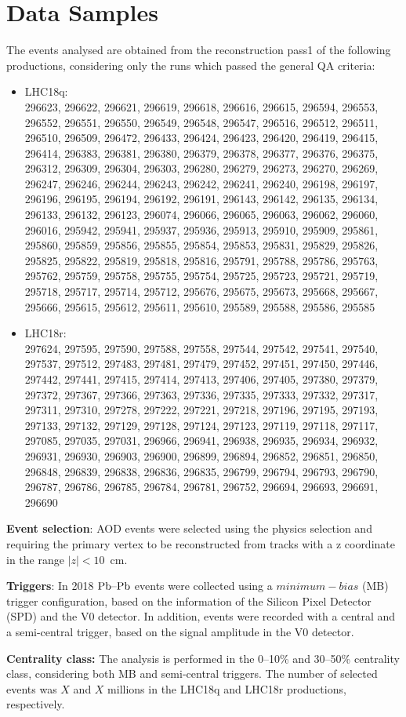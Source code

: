 \section{Data Samples}
The events analysed are obtained from the reconstruction pass1 of the following productions, considering only the runs which passed the general QA criteria:\\

\begin{itemize}
\item LHC18q:\\
 296623, 296622, 296621, 296619, 296618, 296616, 296615, 296594, 296553, 296552, 296551, 296550, 296549, 296548, 296547, 296516, 296512, 296511, 296510, 296509, 296472, 296433, 296424, 296423, 296420, 296419, 296415, 296414, 296383, 296381, 296380, 296379, 296378, 296377, 296376, 296375, 296312, 296309, 296304, 296303, 296280, 296279, 296273, 296270, 296269, 296247, 296246, 296244, 296243, 296242, 296241, 296240, 296198, 296197, 296196, 296195, 296194, 296192, 296191, 296143, 296142, 296135, 296134, 296133, 296132, 296123, 296074, 296066, 296065, 296063, 296062, 296060, 296016, 295942, 295941, 295937, 295936, 295913, 295910, 295909, 295861, 295860, 295859, 295856, 295855, 295854, 295853, 295831, 295829, 295826, 295825, 295822, 295819, 295818, 295816, 295791, 295788, 295786, 295763, 295762, 295759, 295758, 295755, 295754, 295725, 295723, 295721, 295719, 295718, 295717, 295714, 295712, 295676, 295675, 295673, 295668, 295667, 295666, 295615, 295612, 295611, 295610, 295589, 295588, 295586, 295585 
\item LHC18r:\\
 297624, 297595, 297590, 297588, 297558, 297544, 297542, 297541, 297540, 297537, 297512, 297483, 297481, 297479, 297452, 297451, 297450, 297446, 297442, 297441, 297415, 297414, 297413, 297406, 297405, 297380, 297379, 297372, 297367, 297366, 297363, 297336, 297335, 297333, 297332, 297317, 297311, 297310, 297278, 297222, 297221, 297218, 297196, 297195, 297193, 297133, 297132, 297129, 297128, 297124, 297123, 297119, 297118, 297117, 297085, 297035, 297031, 296966, 296941, 296938, 296935, 296934, 296932, 296931, 296930, 296903, 296900, 296899, 296894, 296852, 296851, 296850, 296848, 296839, 296838, 296836, 296835, 296799, 296794, 296793, 296790, 296787, 296786, 296785, 296784, 296781, 296752, 296694, 296693, 296691, 296690 
\end{itemize}

{\bf Event selection}: AOD events were selected using the physics selection and requiring the primary vertex to be reconstructed from tracks with a z coordinate in the range $|z|<10$~cm.

{\bf Triggers}: In 2018 $\mbox{Pb--Pb}$ events were collected using a $minimum-bias$ (MB) trigger configuration, based on the information of the Silicon Pixel Detector (SPD) and the V0 detector. In addition, events were recorded with a central and a semi-central trigger, based on the signal amplitude in the V0 detector.

{\bf Centrality class:} The analysis is performed in the 0--10\% and 30--50\% centrality class, considering both MB and semi-central triggers. The number of selected events was $X$ and $X$ millions in the LHC18q and LHC18r productions, respectively.

